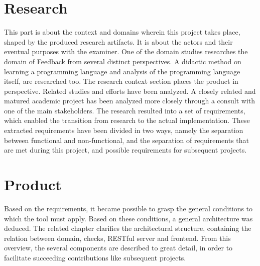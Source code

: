 \section{Research}
This part is about the context and domains wherein this project takes place, 
shaped by the produced research artifacts.
It is about the actors and their eventual purposes with the \gls{examiner}. One
of the domain studies researches the domain of Feedback from several distinct
perspectives. A didactic method on learning a programming language and
analysis of the programming language itself, are researched too. The research 
context section places the product in perspective. Related studies and efforts 
have been analyzed. A closely related and matured academic project has been 
analyzed more closely through a consult with one of the main stakeholders.
The research resulted into a set of requirements, which enabled the transition
from research to the actual implementation. These extracted requirements have
been divided in two ways, namely the separation between functional and 
non-functional, and the separation of requirements that are met during this
project, and possible requirements for subsequent projects.

\section{Product}
Based on the requirements, it became possible to grasp the general conditions 
to which the tool must apply. Based on these conditions, a general architecture
was deduced. The related chapter clarifies the architectural structure, 
containing the relation between domain, \glspl{check}, RESTful server and frontend.
From this overview, the several components are described to great detail, in
order to facilitate succeeding contributions like subsequent projects.


